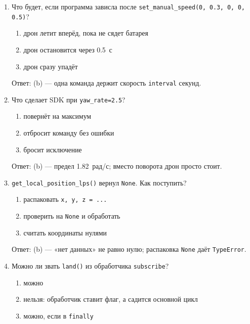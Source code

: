\begin{enumerate}
    \begin{enumerate}[label=(\alph*)] \item полный красный: значение обрежется до 1 \item ошибка \item светодиод выключится \end{enumerate}
    Ответ: (a) --- ошибки нет, цвет в SDK~2 --- доли от 0 до 1 (в первом SDK максимумом было 255). Поэтому оттенки, подобранные в шкале 0..255 (скажем, оранжевый 255, 128, 0), превращаются в «чистые» цвета: средние значения тоже обрезаются до 1.
  \item Что будет, если программа зависла после \verb|set_manual_speed(0, 0.3, 0, 0, 0.5)|?
    \begin{enumerate}[label=(\alph*)] \item дрон летит вперёд, пока не сядет батарея \item дрон остановится через 0.5~с \item дрон сразу упадёт \end{enumerate}
    Ответ: (b) --- одна команда держит скорость \verb|interval| секунд.
  \item Что сделает SDK при \verb|yaw_rate=2.5|?
    \begin{enumerate}[label=(\alph*)] \item повернёт на максимум \item отбросит команду без ошибки \item бросит исключение \end{enumerate}
    Ответ: (b) --- предел 1.82~рад/с; вместо поворота дрон просто стоит.
  \item \verb|get_local_position_lps()| вернул \verb|None|. Как поступить?
    \begin{enumerate}[label=(\alph*)] \item распаковать \verb|x, y, z = ...| \item проверить на \verb|None| и обработать \item считать координаты нулями \end{enumerate}
    Ответ: (b) --- «нет данных» не равно нулю; распаковка \verb|None| даёт \verb|TypeError|.
  \item Можно ли звать \verb|land()| из обработчика \verb|subscribe|?
    \begin{enumerate}[label=(\alph*)] \item можно \item нельзя: обработчик ставит флаг, а садится основной цикл \item можно, если в \verb|finally| \end{enumerate}

\end{enumerate}
